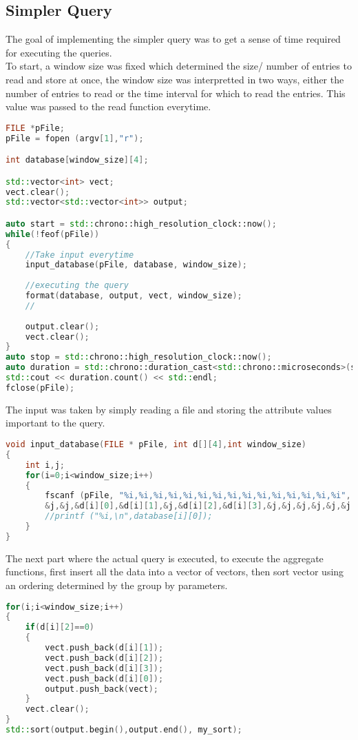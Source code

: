 \subsection{Simpler Query}
The goal of implementing the simpler query was to get a sense of time required for executing the queries.\\
To start, a window size was fixed which determined the size/ number of entries to read and store at once, the window size was interpretted in two ways, either the number of entries to read or the time interval for which to read the entries. This value was passed to the read function everytime.
\begin{lstlisting}[language=C++]
FILE *pFile;
pFile = fopen (argv[1],"r");

int database[window_size][4];

std::vector<int> vect;
vect.clear();
std::vector<std::vector<int>> output;

auto start = std::chrono::high_resolution_clock::now();
while(!feof(pFile))
{
    //Take input everytime
    input_database(pFile, database, window_size);
    
    //executing the query
    format(database, output, vect, window_size);
    // 
    
    output.clear();
    vect.clear();
}
auto stop = std::chrono::high_resolution_clock::now(); 
auto duration = std::chrono::duration_cast<std::chrono::microseconds>(stop - start);
std::cout << duration.count() << std::endl;
fclose(pFile);
\end{lstlisting}
The input was taken by simply reading a file and storing the attribute values important to the query. 
\begin{lstlisting}[language=C++]
void input_database(FILE * pFile, int d[][4],int window_size)
{
    int i,j;
    for(i=0;i<window_size;i++)
    {
        fscanf (pFile, "%i,%i,%i,%i,%i,%i,%i,%i,%i,%i,%i,%i,%i,%i,%i", &j,
        &j,&j,&d[i][0],&d[i][1],&j,&d[i][2],&d[i][3],&j,&j,&j,&j,&j,&j,&j);
        //printf ("%i,\n",database[i][0]);
    }
}
\end{lstlisting}
The next part where the actual query is executed, to execute the aggregate functions, first insert all the data into a vector of vectors, then sort vector using an ordering determined by the group by parameters. 
\begin{lstlisting}[language=C++]
for(i;i<window_size;i++)
{
    if(d[i][2]==0)
    {
        vect.push_back(d[i][1]);
        vect.push_back(d[i][2]);
        vect.push_back(d[i][3]);
        vect.push_back(d[i][0]);
        output.push_back(vect);
    }
    vect.clear();
}
std::sort(output.begin(),output.end(), my_sort);
\end{lstlisting}
